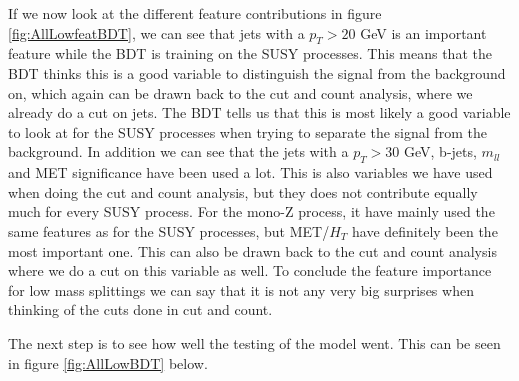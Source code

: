 If we now look at the different feature contributions in figure \ref{fig:AllLowfeatBDT}, we can see that jets with a $p_T > 20$ GeV is an important feature while the BDT is training on the SUSY processes. This means that the BDT thinks this is a good variable to distinguish the signal from the background on, which again can be drawn back to the cut and count analysis, where we already do a cut on jets. The BDT tells us that this is most likely a good variable to look at for the SUSY processes when trying to separate the signal from the background. In addition we can see that the jets with a $p_T > 30$ GeV, b-jets, $m_{ll}$ and MET significance have been used a lot. This is also variables we have used when doing the cut and count analysis, but they does not contribute equally much for every SUSY process. For the mono-Z process, it have mainly used the same features as for the SUSY processes, but MET/$H_T$ have definitely been the most important one. This can also be drawn back to the cut and count analysis where we do a cut on this variable as well. To conclude the feature importance for low mass splittings we can say that it is not any very big surprises when thinking of the cuts done in cut and count.

The next step is to see how well the testing of the model went. This can be seen in figure \ref{fig:AllLowBDT} below.

